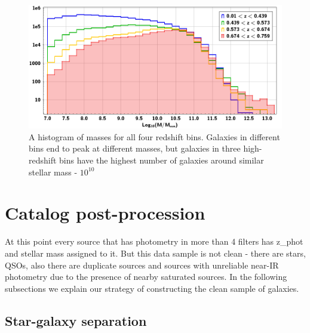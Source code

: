 \begin{figure}[!ht]
\includegraphics[width=5.7in]{Figures/histogram_all_stellar_mass_z_bins.png}
\caption{A histogram of masses for all four redshift bins. Galaxies in different bins end to peak at different masses, but galaxies in three high-redshift bins have the highest number of galaxies around similar stellar mass - $10^{10}$}
\label{fig:hist_mass}
\end{figure}

\section{Catalog post-procession}

At this point every source that has photometry in more than 4 filters has z\_phot and stellar mass assigned to it. But this data sample is not clean - there are stars, QSOs, also there are duplicate sources and sources with unreliable near-IR photometry due to the presence of nearby saturated sources. In the following subsections we explain our strategy of constructing the clean sample of galaxies.

\subsection{Star-galaxy separation}


